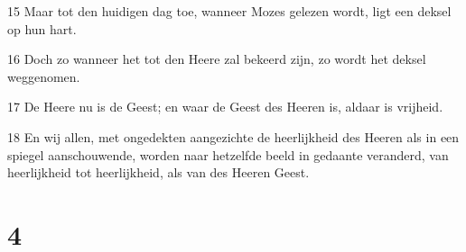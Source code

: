 \par 15 Maar tot den huidigen dag toe, wanneer Mozes gelezen wordt, ligt een deksel op hun hart.
\par 16 Doch zo wanneer het tot den Heere zal bekeerd zijn, zo wordt het deksel weggenomen.
\par 17 De Heere nu is de Geest; en waar de Geest des Heeren is, aldaar is vrijheid.
\par 18 En wij allen, met ongedekten aangezichte de heerlijkheid des Heeren als in een spiegel aanschouwende, worden naar hetzelfde beeld in gedaante veranderd, van heerlijkheid tot heerlijkheid, als van des Heeren Geest.

\chapter{4}

